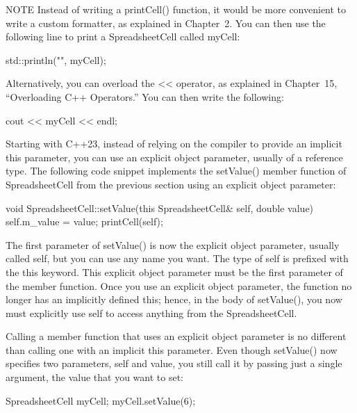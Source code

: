 \begin{myNotic}{NOTE}
Instead of writing a printCell() function, it would be more convenient to write a custom formatter, as explained in Chapter 2. You can then use the following line to print a SpreadsheetCell called myCell:

\begin{cpp}
std::println("{}", myCell);
\end{cpp}

Alternatively, you can overload the <{}< operator, as explained in Chapter 15, “Overloading C++ Operators.” You can then write the following:

\begin{cpp}
cout << myCell << endl;
\end{cpp}
\end{myNotic}



Starting with C++23, instead of relying on the compiler to provide an implicit this parameter, you can use an explicit object parameter, usually of a reference type. The following code snippet implements the setValue() member function of SpreadsheetCell from the previous section using an explicit object parameter:

\begin{cpp}
void SpreadsheetCell::setValue(this SpreadsheetCell& self, double value)
{
    self.m_value = value;
    printCell(self);
}
\end{cpp}

The first parameter of setValue() is now the explicit object parameter, usually called self, but you can use any name you want. The type of self is prefixed with the this keyword. This explicit object parameter must be the first parameter of the member function. Once you use an explicit object parameter, the function no longer has an implicitly defined this; hence, in the body of setValue(), you now must explicitly use self to access anything from the SpreadsheetCell.

Calling a member function that uses an explicit object parameter is no different than calling one with an implicit this parameter. Even though setValue() now specifies two parameters, self and value, you still call it by passing just a single argument, the value that you want to set:

\begin{cpp}
SpreadsheetCell myCell;
myCell.setValue(6);
\end{cpp}

